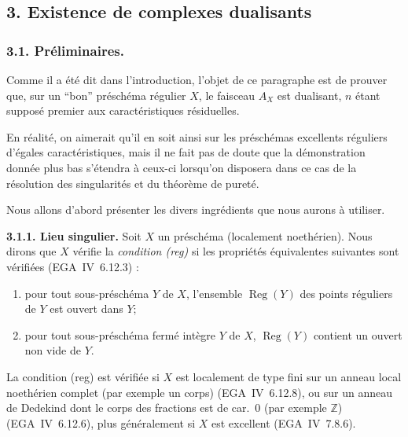 \documentclass[11pt]{article}
\DeclareMathOperator{\Reg}{Reg}
\newcommand{\Z}{\mathbb{Z}}
\providecommand{\Z}{\mathbb Z}
\begin{document}
\subsection{3. Existence de complexes dualisants}

\subsubsection{3.1. Préliminaires.}

Comme il a été dit dans l'introduction, l'objet de ce paragraphe est de prouver que, sur un ``bon'' préschéma régulier $X$, le faisceau $A_X$ est dualisant, $n$ étant supposé premier aux caractéristiques résiduelles.

En réalité, on aimerait qu'il en soit ainsi sur les préschémas excellents réguliers d'égales caractéristiques, mais il ne fait pas de doute que la démonstration donnée plus bas s'étendra à ceux-ci lorsqu'on disposera dans ce cas de la résolution des singularités et du théorème de pureté.

Nous allons d'abord présenter les divers ingrédients que nous aurons à utiliser.

\textbf{3.1.1. Lieu singulier.} Soit $X$ un préschéma (localement noethérien). Nous dirons que $X$ vérifie la \emph{condition (reg)} si les propriétés équivalentes suivantes sont vérifiées (EGA~IV~6.12.3) :
\begin{enumerate}
\item[(i)] pour tout sous-préschéma $Y$ de $X$, l'ensemble $\Reg(Y)$ des points réguliers de $Y$ est ouvert dans $Y$;
\item[(ii)] pour tout sous-préschéma fermé intègre $Y$ de $X$, $\Reg(Y)$ contient un ouvert non vide de $Y$.
\end{enumerate}

La condition (reg) est vérifiée si $X$ est localement de type fini sur un anneau local noethérien complet (par exemple un corps) (EGA~IV~6.12.8), ou sur un anneau de Dedekind dont le corps des fractions est de car.~0 (par exemple $\Z$) (EGA~IV~6.12.6), plus généralement si $X$ est excellent (EGA~IV~7.8.6).
\end{document}
